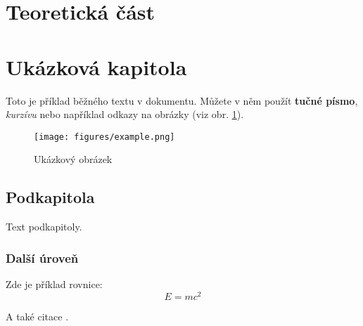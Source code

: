 \newpage
\section{Teoretická část}

\section{Ukázková kapitola}
Toto je příklad běžného textu v dokumentu. 
Můžete v něm použít \textbf{tučné písmo}, \textit{kurzívu} nebo například odkazy na obrázky (viz obr. \ref{fig:example}).

\begin{figure}[h]
    \centering
    \texttt{[image: figures/example.png]}
    \caption{Ukázkový obrázek}
    \label{fig:example}
\end{figure}

\subsection{Podkapitola}
Text podkapitoly. 

\subsubsection{Další úroveň}
Zde je příklad rovnice:
\begin{equation}
E = mc^2
\end{equation}

A také citace \cite{einstein_relativity_1905}.

